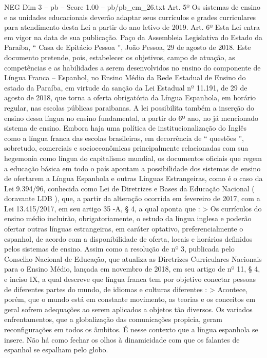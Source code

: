 \begin{textsample}{NEG Dim 3 – pb – Score 1.00 – pb/pb\_em\_26.txt}
Art. 5º Os sistemas de ensino e as unidades educacionais deverão adaptar seus currículos e grades curriculares para atendimento desta Lei a partir do ano letivo de 2019.
Art. 6º Esta Lei entra em vigor na data de sua publicação.
Paço da Assembleia Legislativa do Estado da Paraíba, “ Casa de Epitácio Pessoa ”, João Pessoa, 29 de agosto de 2018.
Este documento pretende, pois, estabelecer os objetivos, campo de atuação, as competências e as habilidades a serem desenvolvidos no ensino do componente de Língua Franca – Espanhol, no Ensino Médio da Rede Estadual de Ensino do estado da Paraíba, em virtude da sanção da Lei Estadual nº 11.191, de 29 de agosto de 2018, que torna a oferta obrigatória da Língua Espanhola, em horário regular, nas escolas públicas paraibanas.
A lei possibilita também a inserção do ensino dessa língua no ensino fundamental, a partir do 6º ano, no já mencionado sistema de ensino.
Embora haja uma política de institucionalização do Inglês como a língua franca das escolas brasileiras, em decorrência de “ questões ”, sobretudo, comerciais e socioeconômicas principalmente relacionadas com sua hegemonia como língua do capitalismo mundial, os documentos oficiais que regem a educação básica em todo o país apontam a possibilidade dos sistemas de ensino de ofertarem a Língua Espanhola e outras Línguas Estrangeiras, como é o caso da Lei 9.394/96, conhecida como Lei de Diretrizes e Bases da Educação Nacional ( doravante LDB ), que, a partir da alteração ocorrida em fevereiro de 2017, com a Lei 13.415/2017, em seu artigo 35 -A, § 4, a qual aponta que : > Os currículos do ensino médio incluirão, obrigatoriamente, o estudo da língua inglesa e poderão ofertar outras línguas estrangeiras, em caráter optativo, preferencialmente o espanhol, de acordo com a disponibilidade de oferta, locais e horários definidos pelos sistemas de ensino.
Assim como a resolução de nº 3, publicada pelo Conselho Nacional de Educação, que atualiza as Diretrizes Curriculares Nacionais para o Ensino Médio, lançada em novembro de 2018, em seu artigo de nº 11, § 4, e inciso IX, a qual descreve que língua franca tem por objetivo conectar pessoas de diferentes partes do mundo, de idiomas e culturas diferentes : > Acontece, porém, que o mundo está em constante movimento, as teorias e os conceitos em geral sofrem adequações ao serem aplicados a objetos tão diversos.
Os variados enfrentamentos, que a globalização das comunicações propicia, geram reconfigurações em todos os âmbitos.
É nesse contexto que a língua espanhola se insere.
Não há como fechar os olhos à dinamicidade com que os falantes de espanhol se espalham pelo globo.

\end{textsample}
